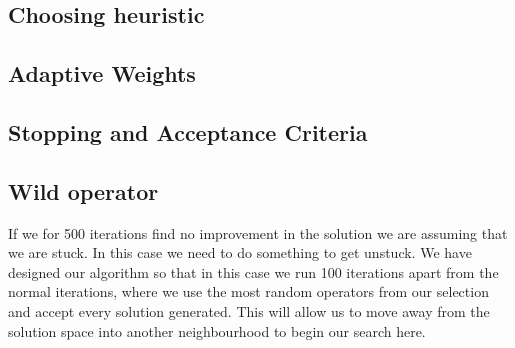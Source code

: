 \documentclass[../main.tex]{subfiles}
\begin{document}
\subsection{Choosing heuristic}

\subsection{Adaptive Weights}

\subsection{Stopping and Acceptance Criteria}

\subsection{Wild operator}
If we for 500 iterations find no improvement in the solution we are assuming that we are stuck. In this case we need to do something to get unstuck. We have designed our algorithm so that in this case we run 100 iterations apart from the normal iterations, where we use the most random operators from our selection and accept every solution generated. This will allow us to move away from the solution space into another neighbourhood to begin our search here.


\biblio
\end{document}
